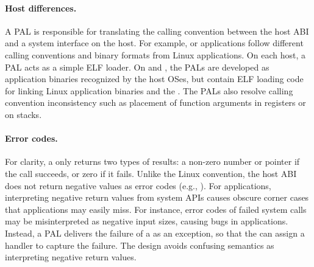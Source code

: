 


\paragraph{Host differences.}
A PAL is responsible for translating the calling convention between the host ABI and a system interface on the host.
For example,
\win{} or \osx{} applications follow different calling conventions and binary formats
from Linux applications.
On each host, a PAL acts as a simple ELF loader.
On \win{} and \osx{}, the PALs are developed as application binaries recognized by the host OSes,
but contain ELF loading code for linking 
Linux application binaries and the \libos{}.
The PALs also resolve calling convention inconsistency
such as placement of function arguments
in registers or on stacks.




\paragraph{Error codes.}
For clarity, a \hostapi{} only returns two types of results:
a non-zero number or pointer if the call succeeds, or zero if it fails.
Unlike the Linux convention, the host ABI does not return negative values as error codes (e.g., ).
For applications,
interpreting negative return values from system APIs
causes obscure corner cases
that applications may easily miss.
For instance, error codes of failed  system calls may be misinterpreted as
negative input sizes,  
causing bugs in applications.
Instead, a PAL delivers the failure of a \hostapi{}
as an exception, so that the \libos{} can assign a handler to capture the failure.
The design avoids confusing semantics
as interpreting negative return values.



